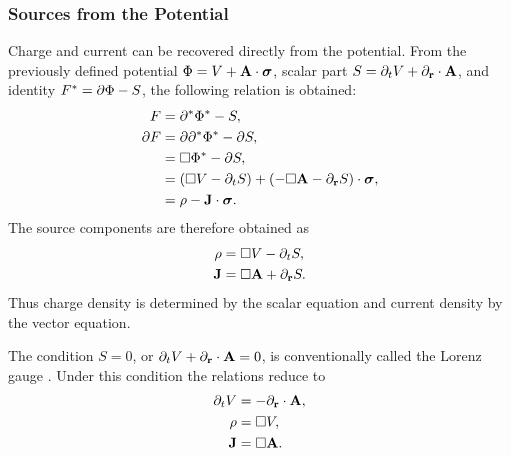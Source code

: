 \subsubsection{Sources from the Potential}
Charge and current can be recovered directly from the potential.
From the previously defined potential \(\Phi=V+\mathbf{A}\cdot\mathbf{\bm{\sigma}}\), scalar part \(S=\partial_t V+\partial_{\mathbf{r}}\cdot\mathbf{A}\), and identity \(F^{*}=\partial\Phi-S\), the following relation is obtained:
\begin{align*}
F &= \partial^{*} \Phi^{*} - S,\notag \\
\partial F
&= \partial\partial^{*}\Phi^{*}
- \partial S,\notag \\
&= \Box \Phi^{*} - \partial S,\notag \\
&= ( \Box V - \partial _{t} S) + (- \Box \mathbf{A} - \partial_{\mathbf{r}} S) \cdot \mathbf{\bm{\sigma}},\notag \\
&= \rho - \mathbf{J} \cdot \mathbf{\bm{\sigma}}.
\end{align*}
The source components are therefore obtained as
\begin{align*}
\rho &= \Box V - \partial _{t} S, \\
\mathbf{J} &= \Box \mathbf{A} + \partial_{\mathbf{r}} S.
\end{align*}
Thus charge density is determined by the scalar equation and current density
by the vector equation.

The condition \(S=0\), or
\(\partial_tV+\partial_{\mathbf{r}}\cdot\mathbf{A}=0\), is conventionally called the Lorenz
gauge \cite{jackson1998}. Under this condition the relations reduce to
\begin{align*}
\partial _{t} V &= -\partial_{\mathbf{r}} \cdot \mathbf{A}, \\
\rho &= \Box V, \\
\mathbf{J} &= \Box \mathbf{A}.
\end{align*}

